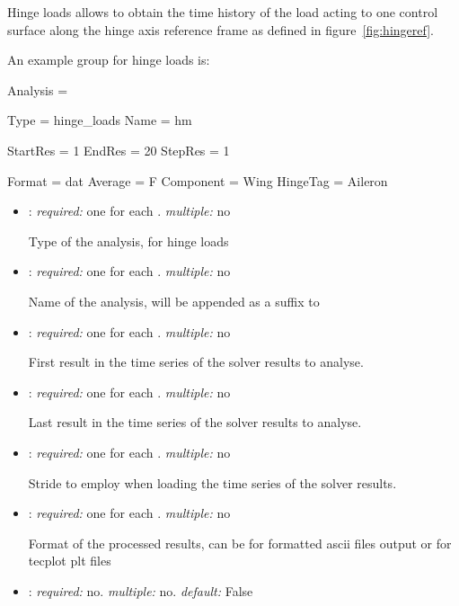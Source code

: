 Hinge loads allows to obtain the time history of the load acting to one control surface along the hinge axis reference frame as defined in figure~\ref{fig:hingeref}. 

An example  group for hinge loads is:

\begin{inputfile}
Analysis = {
  Type = hinge_loads
  Name = hm

  StartRes = 1
  EndRes = 20
  StepRes = 1

  Format = dat
  Average = F
  Component = Wing
  HingeTag = Aileron
}
\end{inputfile}

\begin{itemize}
\item {}: \textit{required:} one for each . \textit{multiple:} no

Type of the analysis,  for hinge loads

\item {}: \textit{required:} one for each . \textit{multiple:} no

Name of the analysis, will be appended as a suffix to 

\item {}: \textit{required:} one for each . \textit{multiple:} no

First result in the time series of the solver results to analyse.

\item {}: \textit{required:} one for each . \textit{multiple:} no

Last result in the time series of the solver results to analyse.

\item {}: \textit{required:} one for each . \textit{multiple:} no

Stride to employ when loading the time series of the solver results. 

\item {}: \textit{required:} one for each . \textit{multiple:} no

Format of the processed results, can be  for formatted ascii files output or  for tecplot plt files

\item {}: \textit{required:} no. \textit{multiple:} no. \textit{default:} False


\end{itemize}
